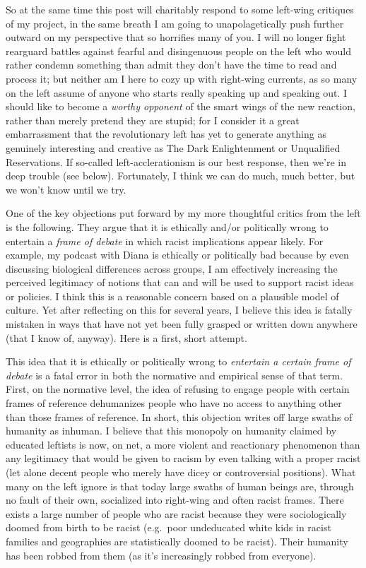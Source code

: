 \documentclass[a4paper,12pt,margin=.5in]{article}
\begin{document}
So at the same time this post will charitably respond to some left-wing
critiques of my project, in the same breath I am going to
unapolagetically push further outward on my perspective that so
horrifies many of you. I will no longer fight rearguard battles against
fearful and disingenuous people on the left who would rather condemn
something than admit they don't have the time to read and process it;
but neither am I here to cozy up with right-wing currents, as so many on
the left assume of anyone who starts really speaking up and speaking
out. I should like to become a \emph{worthy opponent} of the smart wings
of the new reaction, rather than merely pretend they are stupid; for I
consider it a great embarrassment that the revolutionary left has yet to
generate anything as genuinely interesting and creative as The Dark
Enlightenment or Unqualified Reservations. If so-called
left-acclerationism is our best response, then we're in deep trouble
(see below). Fortunately, I think we can do much, much better, but we
won't know until we try.

One of the key objections put forward by my more thoughtful critics from
the left is the following. They argue that it is ethically and/or
politically wrong to entertain a \emph{frame of debate} in which racist
implications appear likely. For example, my podcast with Diana is
ethically or politically bad because by even discussing biological
differences across groups, I am effectively increasing the perceived
legitimacy of notions that can and will be used to support racist ideas
or policies. I think this is a reasonable concern based on a plausible
model of culture. Yet after reflecting on this for several years, I
believe this idea is fatally mistaken in ways that have not yet been
fully grasped or written down anywhere (that I know of, anyway). Here is
a first, short attempt.

This idea that it is ethically or politically wrong to \emph{entertain a
certain frame of debate} is a fatal error in both the normative and
empirical sense of that term. First, on the normative level, the idea of
refusing to engage people with certain frames of reference dehumanizes
people who have no access to anything other than those frames of
reference. In short, this objection writes off large swaths of humanity
as inhuman. I believe that this monopoly on humanity claimed by educated
leftists is now, on net, a more violent and reactionary phenomenon than
any legitimacy that would be given to racism by even talking with a
proper racist (let alone decent people who merely have dicey or
controversial positions). What many on the left ignore is that today
large swaths of human beings are, through no fault of their own,
socialized into right-wing and often racist frames. There exists a large
number of people who are racist because they were sociologically doomed
from birth to be racist (e.g.~poor undeducated white kids in racist
families and geographies are statistically doomed to be racist). Their
humanity has been robbed from them (as it's increasingly robbed from
everyone).
\end{document}
